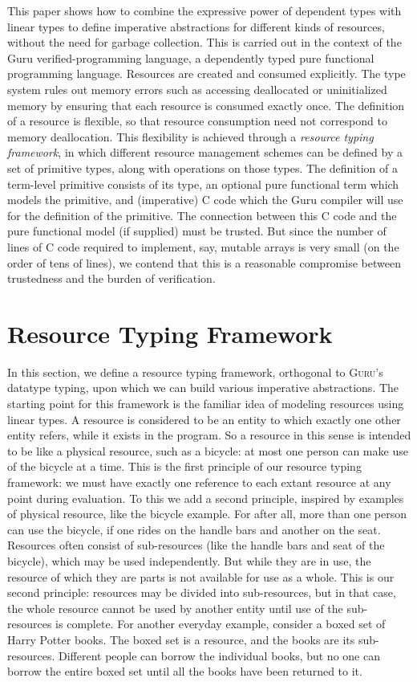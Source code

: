 \documentclass[9pt,natbib]{sigplanconf}
\begin{document}
This paper shows how to combine the expressive power of dependent
types with linear types to define imperative abstractions for
different kinds of resources, without the need for garbage collection.
This is carried out in the context of the Guru verified-programming
language, a dependently typed pure functional programming language.
Resources are created and consumed explicitly.  The type system rules
out memory errors such as accessing deallocated or uninitialized
memory by ensuring that each resource is consumed exactly once.  The
definition of a resource is flexible, so that resource consumption
need not correspond to memory deallocation.  This flexibility is
achieved through a \emph{resource typing framework}, in which
different resource management schemes can be defined by a set of
primitive types, along with operations on those types.  The definition
of a term-level primitive consists of its type, an optional pure
functional term which models the primitive, and (imperative) C code
which the Guru compiler will use for the definition of the primitive.
The connection between this C code and the pure functional model (if
supplied) must be trusted.  But since the number of lines of C code
required to implement, say, mutable arrays is very small (on the order
of tens of lines), we contend that this is a reasonable compromise
between trustedness and the burden of verification.

\section{Resource Typing Framework}

In this section, we define a resource typing framework, orthogonal to
\textsc{Guru}'s datatype typing, upon which we can build various
imperative abstractions.  The starting point for this framework is the
familiar idea of modeling resources using linear types.  A resource is
considered to be an entity to which exactly one other entity refers,
while it exists in the program.  So a resource in this sense is
intended to be like a physical resource, such as a bicycle: at most
one person can make use of the bicycle at a time.  This is the first
principle of our resource typing framework: we must have exactly one
reference to each extant resource at any point during evaluation.  To
this we add a second principle, inspired by examples of physical
resource, like the bicycle example.  For after all, more than one
person can use the bicycle, if one rides on the handle bars and
another on the seat.  Resources often consist of sub-resources (like
the handle bars and seat of the bicycle), which may be used
independently.  But while they are in use, the resource of which they
are parts is not available for use as a whole.  This is our second
principle: resources may be divided into sub-resources, but in that
case, the whole resource cannot be used by another entity until use of
the sub-resources is complete.  For another everyday example, consider
a boxed set of Harry Potter books.  The boxed set is a resource, and
the books are its sub-resources.  Different people can borrow the
individual books, but no one can borrow the entire boxed set until all
the books have been returned to it.
\end{document}
